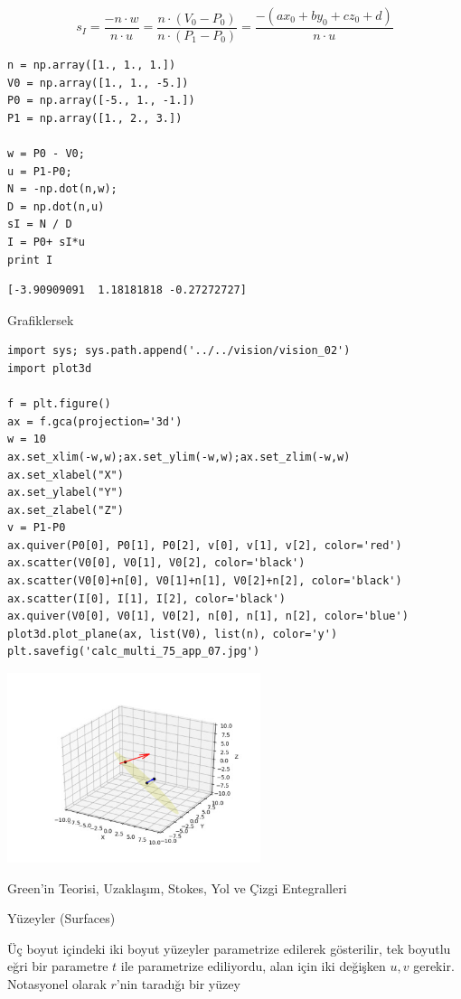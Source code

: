 \documentclass[12pt,fleqn]{article}\usepackage{../../common}
\begin{document}
$$ s_I = \frac{-n \cdot w}{n \cdot u} = 
\frac{n \cdot (V_0 - P_0)}{n \cdot (P_1-P_0)} = 
\frac{-(ax_0 + by_0 + cz_0 + d)}{n \cdot u}
$$

\begin{verbatim}
n = np.array([1., 1., 1.])
V0 = np.array([1., 1., -5.])
P0 = np.array([-5., 1., -1.])
P1 = np.array([1., 2., 3.])

w = P0 - V0;
u = P1-P0;
N = -np.dot(n,w);
D = np.dot(n,u)
sI = N / D
I = P0+ sI*u
print I
\end{verbatim}

\begin{verbatim}
[-3.90909091  1.18181818 -0.27272727]
\end{verbatim}

Grafiklersek

\begin{verbatim}
import sys; sys.path.append('../../vision/vision_02')
import plot3d

f = plt.figure()
ax = f.gca(projection='3d')
w = 10
ax.set_xlim(-w,w);ax.set_ylim(-w,w);ax.set_zlim(-w,w)
ax.set_xlabel("X")
ax.set_ylabel("Y")
ax.set_zlabel("Z")
v = P1-P0
ax.quiver(P0[0], P0[1], P0[2], v[0], v[1], v[2], color='red')
ax.scatter(V0[0], V0[1], V0[2], color='black')
ax.scatter(V0[0]+n[0], V0[1]+n[1], V0[2]+n[2], color='black')
ax.scatter(I[0], I[1], I[2], color='black')
ax.quiver(V0[0], V0[1], V0[2], n[0], n[1], n[2], color='blue')
plot3d.plot_plane(ax, list(V0), list(n), color='y')
plt.savefig('calc_multi_75_app_07.jpg')
\end{verbatim}

\includegraphics[width=20em]{calc_multi_75_app_07.jpg}

Green'in Teorisi, Uzaklaşım, Stokes, Yol ve Çizgi Entegralleri

Yüzeyler (Surfaces)

Üç boyut içindeki iki boyut yüzeyler parametrize edilerek gösterilir,
tek boyutlu eğri bir parametre $t$ ile parametrize ediliyordu, alan için
iki değişken $u,v$ gerekir. Notasyonel olarak $r$'nin taradığı bir yüzey
\end{document}

